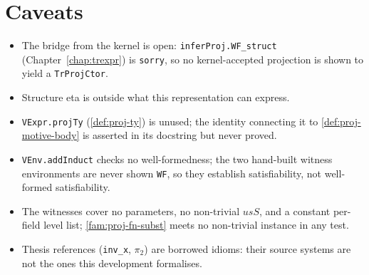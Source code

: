 \section*{Caveats}
\label{sec:proj-review}

\begin{itemize}
\item The bridge from the kernel is open: \texttt{inferProj.WF\_struct} (Chapter~\ref{chap:trexpr})
is \texttt{sorry}, so no kernel-accepted projection is shown to yield a \texttt{TrProjCtor}.
\item Structure eta is outside what this representation can express.
\item \texttt{VExpr.projTy} (\ref{def:proj-ty}) is unused; the identity connecting it to
\ref{def:proj-motive-body} is asserted in its docstring but never proved.
\item \texttt{VEnv.addInduct} checks no well-formedness; the two hand-built witness environments
are never shown \texttt{WF}, so they establish satisfiability, not well-formed satisfiability.
\item The witnesses cover no parameters, no non-trivial $usS$, and a constant per-field level
list; \ref{fam:proj-fn-subst} meets no non-trivial instance in any test.
\item Thesis references (\texttt{inv\_x}, $\pi_2$) are borrowed idioms: their source systems are
not the ones this development formalises.
\end{itemize}
